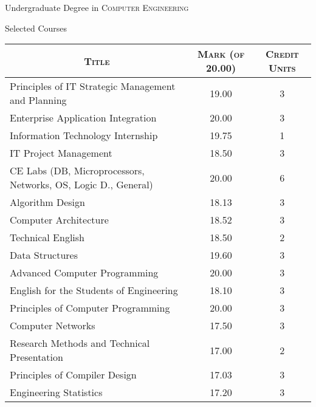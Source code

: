 \par{\centering\Large \hypertarget{grds_usc}{Undergraduate Degree in \textsc{Computer Engineering}}\par}\large{\centering Selected Courses\par}\normalsize
\begin{center}
    \begin{tabular}{lcc}
        \multicolumn{1}{c}{\textsc{Title}}&\textsc{Mark (of 20.00)}&\textsc{Credit Units}\\ \hline
Principles of IT Strategic Management and Planning   & 19.00  & 3            \\
Enterprise Application Integration                   & 20.00  & 3            \\
Information Technology Internship                    & 19.75  & 1            \\
IT Project Management                                & 18.50  & 3            \\
CE Labs (DB, Microprocessors, Networks, OS, Logic D., General) & 20.00  & 6            \\
Algorithm Design                                     & 18.13  & 3            \\
Computer Architecture                                & 18.52  & 3            \\
Technical English                                    & 18.50  & 2            \\
Data Structures                                      & 19.60  & 3            \\
Advanced Computer Programming                        & 20.00  & 3            \\
English for the Students of Engineering              & 18.10  & 3            \\
Principles of Computer Programming                   & 20.00  & 3            \\
Computer Networks                                    & 17.50  & 3            \\
Research Methods and Technical Presentation          & 17.00  & 2            \\
Principles of Compiler Design                        & 17.03  & 3            \\
Engineering Statistics                               & 17.20  & 3        
    \end{tabular}
\end{center}
